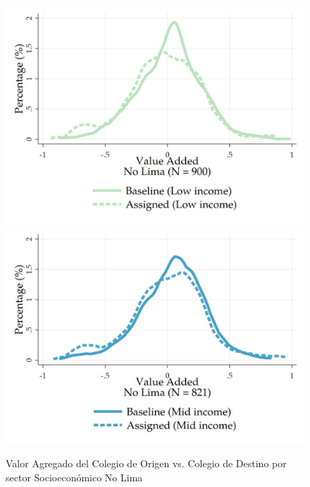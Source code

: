 \documentclass[11pt]{article}
\numberwithin{equation}{section}
\begin{document}
\begin{figure}[!htb]
\caption{Valor Agregado del Colegio de Origen vs. Colegio de Destino por sector Socioecon\'omico \newline No Lima}
    \begin{minipage}[b]{0.99\textwidth}
            \includegraphics[width=\linewidth]{figures/NoLimaLI.jpeg}
            \label{fig:LimaLI}
        \endminipage
        \hfill
            \includegraphics[width=\linewidth]{figures/NoLimaMI.jpeg}
            \label{fig:LimaMI}
        \endminipage
        \hfill

\end{minipage}
\end{figure}
\end{document}

